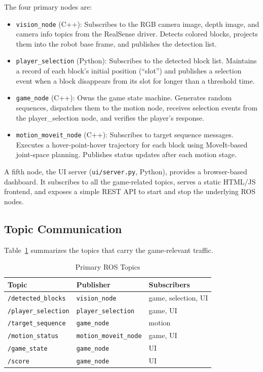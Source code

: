 \documentclass[conference]{IEEEtran}
\begin{document}
The four primary nodes are:

\begin{itemize}
\item \texttt{vision\_node} (C++): Subscribes to the RGB camera image,
depth image, and camera info topics from the RealSense driver.
Detects colored blocks, projects them into the robot base frame, and
publishes the detection list.
\item \texttt{player\_selection} (Python): Subscribes to the detected
block list. Maintains a record of each block's initial position
(``slot'') and publishes a selection event when a block disappears
from its slot for longer than a threshold time.
\item \texttt{game\_node} (C++): Owns the game state machine. Generates
random sequences, dispatches them to the motion node, receives
selection events from the player\_selection node, and verifies the
player's response.
\item \texttt{motion\_moveit\_node} (C++): Subscribes to target sequence
messages. Executes a hover-point-hover trajectory for each block using
MoveIt-based joint-space planning. Publishes status updates after
each motion stage.
\end{itemize}

A fifth node, the UI server (\texttt{ui/server.py}, Python), provides
a browser-based dashboard. It subscribes to all the game-related
topics, serves a static HTML/JS frontend, and exposes a simple REST
API to start and stop the underlying ROS nodes.

\subsection{Topic Communication}

Table~\ref{tab:topics} summarizes the topics that carry the
game-relevant traffic.

\begin{table}[t]
\centering
\caption{Primary ROS Topics}
\label{tab:topics}
\begin{tabular}{lll}
\toprule
\textbf{Topic} & \textbf{Publisher} & \textbf{Subscribers} \\
\midrule
\texttt{/detected\_blocks} & \texttt{vision\_node} & game, selection, UI \\
\texttt{/player\_selection} & \texttt{player\_selection} & game, UI \\
\texttt{/target\_sequence} & \texttt{game\_node} & motion \\
\texttt{/motion\_status} & \texttt{motion\_moveit\_node} & game, UI \\
\texttt{/game\_state} & \texttt{game\_node} & UI \\
\texttt{/score} & \texttt{game\_node} & UI \\
\bottomrule
\end{tabular}
\end{table}
\end{document}
